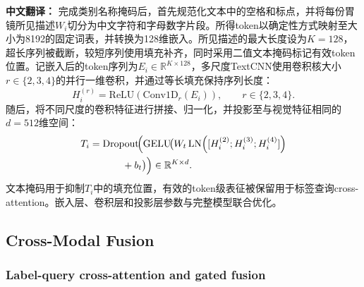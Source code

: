 \documentclass[Afour,sagev,times]{sagej}
\begin{document}
\textbf{中文翻译：} 完成类别名称掩码后，首先规范化文本中的空格和标点，并将每份胃镜所见描述$W_i$切分为中文字符和字母数字片段。所得token以确定性方式映射至大小为8192的固定词表，并转换为128维嵌入。所见描述的最大长度设为$K=128$，超长序列被截断，较短序列使用填充补齐，同时采用二值文本掩码标记有效token位置。记嵌入后的token序列为$E_i\in\mathbb{R}^{K\times128}$，多尺度TextCNN使用卷积核大小$r\in\{2,3,4\}$的并行一维卷积，并通过等长填充保持序列长度：
\begin{equation}
H_i^{(r)}=\mathrm{ReLU}\!\left(\mathrm{Conv1D}_{r}(E_i)\right),
\qquad r\in\{2,3,4\}.
\end{equation}
随后，将不同尺度的卷积特征进行拼接、归一化，并投影至与视觉特征相同的$d=512$维空间：
\begin{equation}
\begin{aligned}
T_i={}&\mathrm{Dropout}\!\Bigl(\mathrm{GELU}\!\bigl(
W_t\,\mathrm{LN}\!\left([H_i^{(2)};H_i^{(3)};H_i^{(4)}]\right)\\
&\qquad+b_t\bigr)\Bigr)\in\mathbb{R}^{K\times d}.
\end{aligned}
\end{equation}
文本掩码用于抑制$T_i$中的填充位置，有效的token级表征被保留用于标签查询cross-attention。嵌入层、卷积层和投影层参数与完整模型联合优化。

\subsection{Cross-Modal Fusion}

\subsubsection{Label-query cross-attention and gated fusion}
\end{document}
